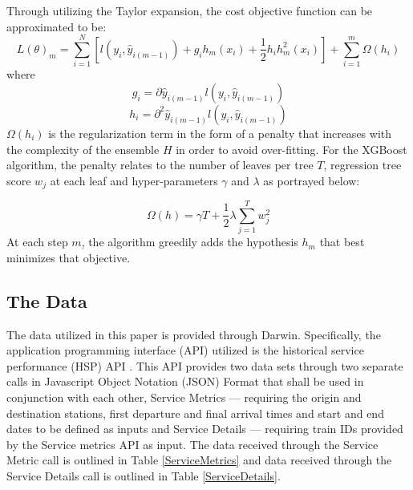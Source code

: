 \documentclass[]{interact}
\theoremstyle{plain}%
\theoremstyle{definition}
\theoremstyle{remark}
\begin{document}
Through utilizing the Taylor expansion, the cost objective function can be approximated to be:
\begin{equation}
    L(\theta)_m = \sum_{i=1}^{N}\left[l(y_i,\hat{y}_{i(m-1)}) + g_i h_m(x_i) + \frac{1}{2}h_i h^2_m(x_i)\right] + \sum_{i=1}^m\Omega(h_i)
\end{equation} 
where
\begin{equation}
    g_i = \partial{\hat{y}_{i(m-1)}}l(y_i,\hat{y}_{i(m-1)})
\end{equation} 
\begin{equation}
    h_i = \partial^2{\hat{y}_{i(m-1)}}l(y_i,\hat{y}_{i(m-1)})
\end{equation} 
$\Omega(h_i)$ is the regularization term in the form of a penalty that increases with the complexity of the ensemble $H$ in order to avoid over-fitting. For the XGBoost algorithm, the penalty relates to the number of leaves per tree $T$, regression tree score $w_j$ at each leaf and hyper-parameters $\gamma$ and $\lambda$ as portrayed below:

\begin{equation}
    \Omega(h) = \gamma T + \frac{1}{2}\lambda \sum_{j=1}^{T}w_j^2
\end{equation} 
At each step $m$, the algorithm greedily adds the hypothesis $h_m$ that best minimizes that objective. 

\subsection{The Data} \label{PreprocessingSection}
The data utilized in this paper is provided through Darwin. Specifically, the application programming interface (API) utilized is the historical service performance (HSP) API \citep{NRE19}. This API provides two data sets through two separate calls in Javascript Object Notation (JSON) Format that shall be used in conjunction with each other, Service Metrics –-- requiring the origin and destination stations, first departure and final arrival times and start and end dates to be defined as inputs and Service Details –-- requiring train IDs provided by the Service metrics API as input. The data received through the Service Metric call is outlined in Table \ref{ServiceMetrics} and data received through the Service Details call is outlined in Table \ref{ServiceDetails}.
\end{document}
